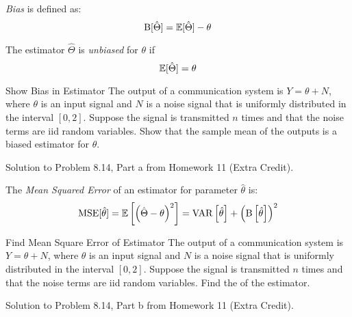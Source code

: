\begin{definition}[Bias]\label{def:Bias}
  \emph{Bias} is defined as:
  \begin{equation}\label{eq:Accuracy}
    \operatorname{\operatorname{B}} [ \hat{\Theta} ] = \operatorname{\operatorname{\mathbb{E}}} [ \hat{\Theta} ] - \theta
  \end{equation}
  \begin{remark}\label{rmk:Unbiased}
    The estimator $\hat{\Theta}$ is \emph{unbiased} for $\theta$ if
    \begin{equation}\label{Unbiased}
      \operatorname{\operatorname{\mathbb{E}}} [ \hat{\Theta} ] = \theta
    \end{equation}
  \end{remark}
\end{definition}
\begin{example}[Problem 8.14]{Show Bias in Estimator}
  The output of a communication system is $Y = \theta + N$, where $\theta$ is an input signal and $N$ is a noise signal that is uniformly distributed in the interval $\left[ 0,2 \right]$.
  Suppose the signal is transmitted $n$ times and that the noise terms are iid random variables.
  Show that the sample mean of the outputs is a biased estimator for $\theta$.

  \tcblower

  Solution to Problem 8.14, Part a from Homework 11 (Extra Credit).
\end{example}

\begin{definition}\label{def:Mean Squared Error}
  The \emph{Mean Squared Error} of an estimator for parameter $\hat{\theta}$ is:
  \begin{equation}\label{eq:Mean Squared Error}
    \operatorname{\operatorname{MSE}} [ \hat{\theta} ]
    = \operatorname{\operatorname{\mathbb{E}}} \left[ \left( \hat{\Theta} - \theta \right)^{2} \right]
    = \operatorname{\operatorname{VAR}} \left[ \hat{\theta} \right] + \left( \operatorname{\operatorname{B}} \left[ \hat{\theta} \right] \right)^{2}
  \end{equation}
\end{definition}
\begin{example}[Problem 8.14]{Find Mean Square Error of Estimator}
  The output of a communication system is $Y = \theta + N$, where $\theta$ is an input signal and $N$ is a noise signal that is uniformly distributed in the interval $\left[ 0,2 \right]$.
  Suppose the signal is transmitted $n$ times and that the noise terms are iid random variables.
  Find the  of the estimator.

  \tcblower

  Solution to Problem 8.14, Part b from Homework 11 (Extra Credit).
\end{example}


